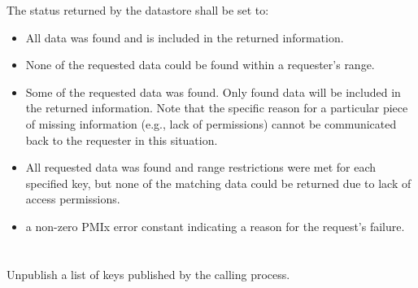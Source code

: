 The status returned by the datastore shall be set to:

\begin{itemize}
\item {} All data was found and is included in the returned information.

\item {} None of the requested data could be found within a requester's range.

\item {} Some of the requested data was found.
Only found data will be included in the returned information. Note that the specific reason for a particular piece of missing information (e.g., lack of permissions) cannot be communicated back to the requester in this situation.

\item {} All requested data was found and range restrictions were met for each specified key, but none of the matching data could be returned due to lack of access permissions.

\item a non-zero \ac{PMIx} error constant indicating a reason for the request's failure.
\end{itemize}

\section{}

\summary

Unpublish a list of keys published by the calling process.

\format


\begin{arglist}
\end{arglist}

